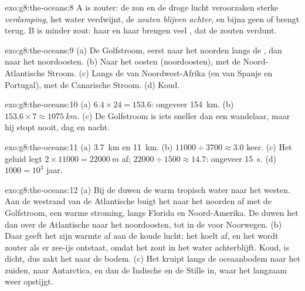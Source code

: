 \begin{solution}{exo:g8:the-oceans:8}
 A is zouter: de zon en de droge lucht veroorzaken sterke
\emph{verdamping}, het water verdwijnt, de \emph{zouten blijven achter}, en
bijna geen  of  brengt \emph{} terug.  B is minder
zout: haar  en haar  brengen veel \emph{}, dat de
zouten verdunt.
\end{solution}

\begin{solution}{exo:g8:the-oceans:9}
(a) De Golfstroom, eerst naar het noorden langs de , dan naar het
noordoosten. (b) Naar het oosten (noordoosten), met de Noord-Atlantische
Stroom. (c) Langs de  van Noordwest-Afrika (en van Spanje en
Portugal), met de Canarische Stroom. (d) Koud.
\end{solution}

\begin{solution}{exo:g8:the-oceans:10}
(a) $6.4 \times 24 = 153.6$: ongeveer \qty{154}{km}. (b) $153.6 \times 7
\approx \qty{1075}{km}$. (c) De Golfstroom is iets sneller dan een
wandelaar, maar hij stopt nooit, dag en nacht.
\end{solution}

\begin{solution}{exo:g8:the-oceans:11}
(a) \qty{3.7}{km} en \qty{11}{km}. (b) $11000 \div 3700 \approx 3.0$
keer. (c) Het geluid legt $2 \times 11000 = \qty{22000}{m}$ af; $22000
\div 1500 \approx 14.7$: ongeveer \qty{15}{s}. (d) $1000 = 10^3$ jaar.
\end{solution}

\begin{solution}{exo:g8:the-oceans:12}
(a) Bij de  duwen de  warm tropisch water naar het
westen. Aan de westrand van de Atlantische  buigt het naar het
noorden af met de Golfstroom, een warme stroming, langs Florida en
Noord-Amerika. De  duwen het dan over de Atlantische 
naar het noordoosten, tot in de  voor Noorwegen. (b) Daar geeft het
zijn warmte af aan de koude lucht: het koelt af, en het wordt zouter als er
zee-ijs ontstaat, omdat het zout in het water achterblijft. Koud,  is dicht, dus zakt het naar de bodem. (c) Het kruipt langs de
oceaanbodem naar het zuiden, naar Antarctica, en dan de Indische en de
Stille  in, waar het langzaam weer opstijgt.
\end{solution}

